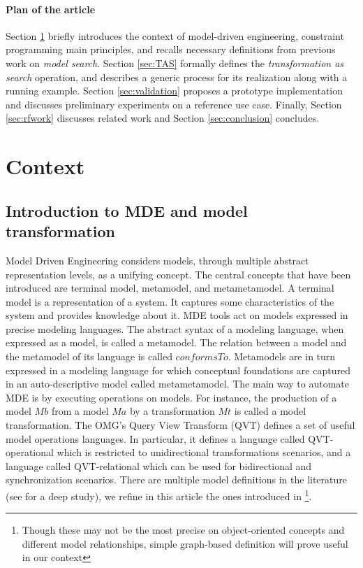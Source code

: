 \documentclass{llncs}
\begin{document}
\paragraph{Plan of the article}
%
Section \ref{sec:context} briefly introduces the context of model-driven
engineering, constraint programming main principles, and recalls necessary
definitions from previous work on \emph{model search}. 
Section \ref{sec:TAS} formally defines the \emph{transformation as search} operation, and describes a generic process for its realization along with a running example. Section \ref{sec:validation} proposes a prototype implementation and discusses preliminary experiments on a reference use case. Finally, Section \ref{sec:rfwork} discusses related work and Section \ref{sec:conclusion} concludes.
%
\section{Context}
\label{sec:context}
\subsection{Introduction to MDE and model transformation}
Model Driven Engineering considers models, through multiple abstract
representation levels, as a unifying concept. The central concepts that have been
introduced are terminal model, metamodel, and metametamodel. A terminal model is
a representation of a system. It captures some characteristics of the system and
provides knowledge about it. MDE tools act on models expressed in
precise modeling languages. The abstract syntax of a modeling language, when
expressed as a model, is called a metamodel. The relation between a model and the
metamodel of its language is called $conformsTo$. Metamodels are in turn
expressed in a modeling language for which conceptual foundations are captured in
an auto-descriptive model called metametamodel. The main way to automate MDE is
by executing operations on models. For instance, the production of a model $Mb$
from a model $Ma$ by a transformation $Mt$ is called a model transformation. The
OMG's Query View Transform (QVT) \cite{QVT} defines a set of useful model
operations languages. In particular, it defines a language called QVT-operational which is restricted to unidirectional transformations scenarios, and a language called QVT-relational which can be used for bidirectional and synchronization scenarios. 
%
There are multiple model definitions in the literature (see \cite{DBLP:journals/sosym/Kuhne06} for a deep study), we refine in this article the
ones introduced in \cite{DBLP:conf/fmoods/JouaultB06}\footnote{Though these may not be the most precise on object-oriented concepts and different model relationships, simple graph-based definition will prove useful in our context}.
\end{document}
